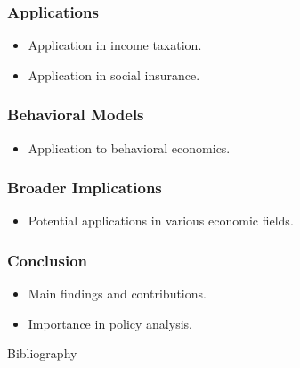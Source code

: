 \documentclass{beamer}
\begin{document}
\begin{frame}
\frametitle{Applications}
\begin{itemize}
    \item Application in income taxation.
    \item Application in social insurance.
\end{itemize}
\end{frame}

\begin{frame}
\frametitle{Behavioral Models}
\begin{itemize}
    \item Application to behavioral economics.
\end{itemize}
\end{frame}

\begin{frame}
\frametitle{Broader Implications}
\begin{itemize}
    \item Potential applications in various economic fields.
\end{itemize}
\end{frame}

\begin{frame}
\frametitle{Conclusion}
\begin{itemize}
    \item Main findings and contributions.
    \item Importance in policy analysis.
\end{itemize}
\end{frame}

\begin{frame}{Bibliography}


\end{frame}
\end{document}
